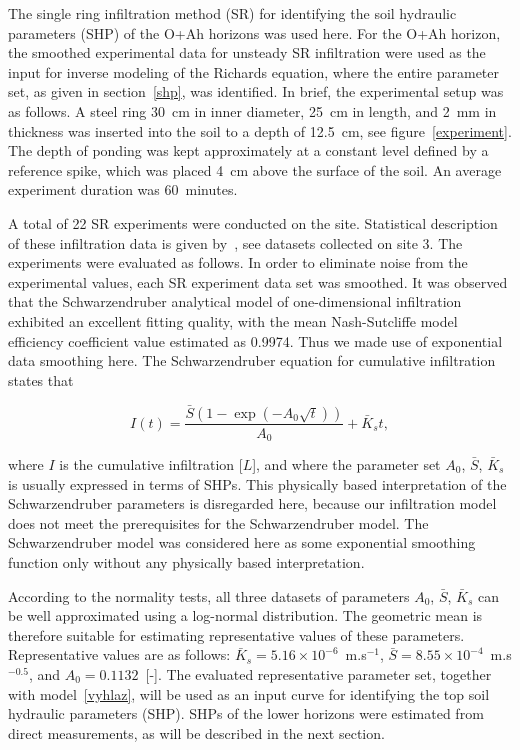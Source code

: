 \documentclass[review]{myarticle}
\newenvironment{lineq}
    {\begin{linenomath*}
    \begin{equation}
    }
    { 
    \end{equation} 
    \end{linenomath*}
    }
\begin{document}
The single ring infiltration method (SR) for identifying the soil hydraulic parameters (SHP) of the O+Ah horizons was used here. 
For the O+Ah horizon, the smoothed experimental data for unsteady SR infiltration were used as the input for inverse modeling of the Richards equation, where the entire parameter set, as given in section~\ref{shp}, was identified. 
In brief, the experimental setup was as follows. A steel ring 30~cm in inner diameter, 25~cm in length, and 2~mm in thickness was inserted into the soil to a depth of 12.5~cm, see figure~\ref{experiment}. The depth of ponding was kept approximately at a constant level defined by a reference spike, which was placed 4~cm above the surface of the soil.  An average experiment duration was 60~minutes.





A total of 22 SR experiments were conducted on the site. Statistical description of these infiltration data is given by~\citep{jacka-site}, see datasets collected on site 3. The experiments were evaluated as follows. In order to eliminate noise from the experimental values, each SR experiment data set was smoothed. It was observed that the Schwarzendruber analytical model of one-dimensional infiltration exhibited an excellent fitting quality, with the mean  Nash-Sutcliffe model efficiency coefficient value estimated as 0.9974. Thus we made use of  exponential data smoothing here. The Schwarzendruber equation for cumulative infiltration  states that
\begin{lineq}
I(t)=\frac{\bar{S}\left(1-\exp\left(-A_0\sqrt{t}\right)\right)}{A_0}+\bar{K}_{s}t,
\label{vyhlaz}
\end{lineq}
where $I$ is the cumulative infiltration [$L$], and where the parameter set $A_0$, $\bar{S}$, $\bar{K}_{s}$ is usually expressed in terms of SHPs. This physically based interpretation of the Schwarzendruber parameters is disregarded here, because our infiltration model does not meet the prerequisites for the Schwarzendruber model. The Schwarzendruber model was  considered here as some exponential smoothing function only without any physically  based interpretation.


According to the normality tests,  all three datasets of  parameters $A_0$, $\bar{S}$, $\bar{K}_{s}$ can be well approximated  using a log-normal distribution. The geometric mean is therefore suitable for estimating representative values of these parameters. Representative values are as follows: $\bar{K}_s = 5.16\times 10^{-6}$~m.s$^{-1}$, $\bar{S} = 8.55\times 10^{-4}$~m.s$^{-0.5}$, and $A_0 = 0.1132$~[-]. The evaluated representative  parameter set, together with  model~\eqref{vyhlaz}, will be used as an input curve for identifying the top soil hydraulic parameters (SHP). SHPs of the lower horizons were estimated from direct measurements, as will be described in the next section.
\end{document}
